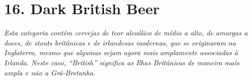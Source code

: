 \section*{16. Dark British Beer}
\textit{Esta categoria contém cervejas de teor alcoólico de médio a alto, de amargas a doces, de stouts britânicas e de irlandesas modernas, que se originaram na Inglaterra, mesmo que algumas sejam agora mais amplamente associadas à Irlanda. Neste caso, “British” significa as Ilhas Britânicas de maneira mais ampla e não a Grã-Bretanha.}
